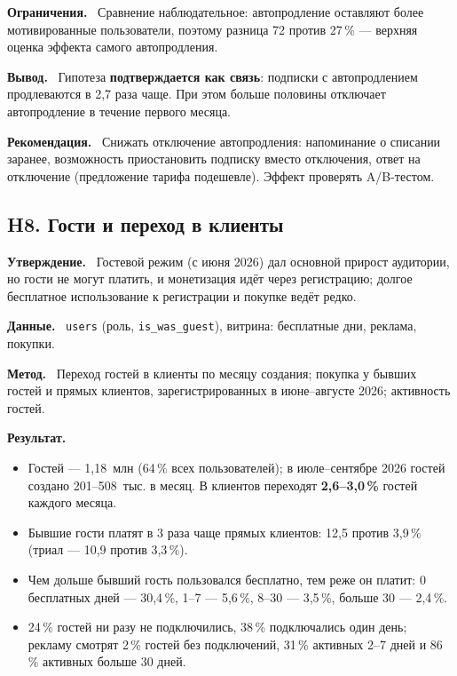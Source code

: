 \documentclass[11pt,a4paper]{article}
\newcommand{\hblock}[1]{\par\smallskip\noindent\textbf{#1.}~}
\begin{document}
\hblock{Ограничения} Сравнение наблюдательное: автопродление оставляют более мотивированные пользователи, поэтому разница 72 против 27\,\% --- верхняя оценка эффекта самого автопродления.

\hblock{Вывод} Гипотеза \textbf{подтверждается как связь}: подписки с автопродлением продлеваются в 2,7 раза чаще. При этом больше половины отключает автопродление в течение первого месяца.

\hblock{Рекомендация} Снижать отключение автопродления: напоминание о списании заранее, возможность приостановить подписку вместо отключения, ответ на отключение (предложение тарифа подешевле). Эффект проверять A/B-тестом.

\subsection{H8. Гости и переход в клиенты}

\hblock{Утверждение} Гостевой режим (с июня 2026) дал основной прирост аудитории, но гости не могут платить, и монетизация идёт через регистрацию; долгое бесплатное использование к регистрации и покупке ведёт редко.

\hblock{Данные} \texttt{users} (роль, \texttt{is\_was\_guest}), витрина: бесплатные дни, реклама, покупки.

\hblock{Метод} Переход гостей в клиенты по месяцу создания; покупка у бывших гостей и прямых клиентов, зарегистрированных в июне--августе 2026; активность гостей.

\hblock{Результат}
\begin{itemize}
  \item Гостей --- 1,18~млн (64\,\% всех пользователей); в июле--сентябре 2026 гостей создано 201--508~тыс. в месяц. В клиентов переходят \textbf{2,6--3,0\,\%} гостей каждого месяца.
  \item Бывшие гости платят в 3 раза чаще прямых клиентов: 12,5 против 3,9\,\% (триал --- 10,9 против 3,3\,\%).
  \item Чем дольше бывший гость пользовался бесплатно, тем реже он платит: 0 бесплатных дней --- 30,4\,\%, 1--7 --- 5,6\,\%, 8--30 --- 3,5\,\%, больше 30 --- 2,4\,\%.
  \item 24\,\% гостей ни разу не подключились, 38\,\% подключались один день; рекламу смотрят 2\,\% гостей без подключений, 31\,\% активных 2--7 дней и 86\,\% активных больше 30 дней.
\end{itemize}
\end{document}
